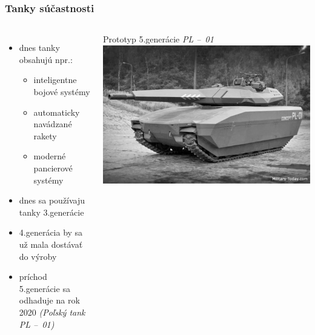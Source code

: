 \documentclass{beamer}
\begin{document}
	
	
	\begin{frame}
		\frametitle{Tanky súčastnosti}
		\begin{columns}
			\begin{itemize}
				\item dnes tanky obsahujú npr.:
				\begin{itemize}
					\item inteligentne bojové systémy
					\item automaticky navádzané rakety
					\item moderné pancierové systémy
				\end{itemize}
				\item dnes sa používaju tanky 3.generácie
				\item 4.generácia by sa už mala dostávať do výroby
				\item príchod 5.generácie sa odhaduje na rok 2020 \linebreak \textit{(Poľský tank PL --\ 01)}
			\end{itemize}
			
			\begin{block}{Prototyp 5.generácie \textit{PL --\ 01}}
				\includegraphics[scale=0.4]{pl01}
			\end{block}
		\end{columns}
	\end{frame}
	
	
	
\end{document}
